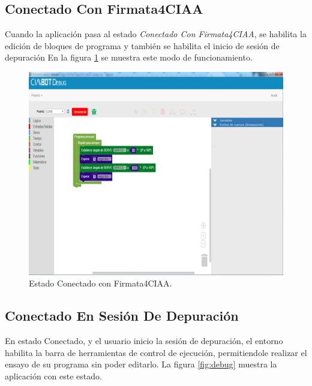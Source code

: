 \subsection{Conectado Con Firmata4CIAA}
\label{subsec:Conectado Con Firmata4CIAA}

Cuando la aplicación pasa al estado \emph{Conectado Con Firmata4CIAA}, se habilita la edición de bloques de programa y también se habilita el inicio de sesión de depuración
En la figura \ref{fig:conectado} se muestra este modo de funcionamiento.


\begin{figure}[!htbp]
	\begin{center}  %
		\includegraphics[width=15cm]{./Figures/debug-conectado.png}
		\par\caption{Estado Conectado con Firmata4CIAA.}\label{fig:conectado}
	\end{center}
\end{figure}

\subsection{Conectado En Sesión De Depuración}
\label{subsec:Conectado En Sesion De Depuración}

En estado Conectado, y el usuario inicio la sesión de depuración, el entorno habilita la barra de herramientas de control de ejecución, permitiendole realizar el ensayo de su programa sin poder editarlo. La figura \ref{fig:debug} muestra la aplicación con este estado.

